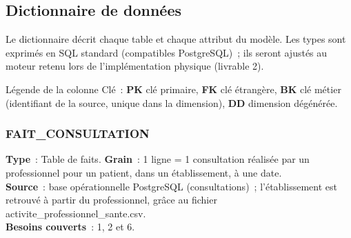 \subsection{Dictionnaire de données}\label{sec:dictionnaire}

\noindent Le dictionnaire décrit chaque table et chaque attribut du modèle. Les types sont exprimés en SQL standard (compatibles PostgreSQL)~; ils seront ajustés au moteur retenu lors de l'implémentation physique (livrable 2).

\vspace{0.2cm}

\noindent Légende de la colonne \og Clé\fg{}~: \textbf{PK} clé primaire, \textbf{FK} clé étrangère, \textbf{BK} clé métier (identifiant de la source, unique dans la dimension), \textbf{DD} dimension dégénérée.

\subsubsection*{FAIT\_CONSULTATION}

\noindent \textbf{Type}~: Table de faits. \textbf{Grain}~: 1 ligne = 1 consultation réalisée par un professionnel pour un patient, dans un établissement, à une date.\\
\textbf{Source}~: base opérationnelle PostgreSQL (consultations)~; l'établissement est retrouvé à partir du professionnel, grâce au fichier activite\_\allowbreak professionnel\_\allowbreak sante.csv.\\
\textbf{Besoins couverts}~: 1, 2 et 6.

